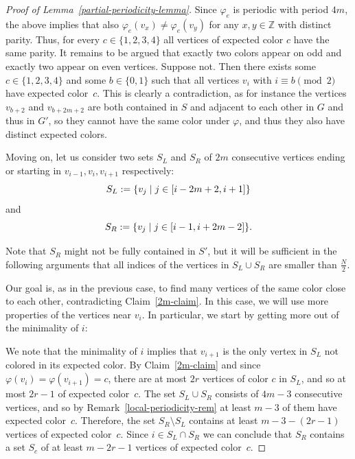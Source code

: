 \documentclass[a4paper,10pt,hidelinks]{amsart}
\renewcommand{\phi}{\ensuremath{\varphi}}
\theoremstyle{definition}
\begin{document}
\begin{proof}[Proof of Lemma~\ref{partial-periodicity-lemma}]
    Since $\phi_e$ is periodic with period $4m$, the above implies that also $\phi_e(v_x)\neq \phi_e(v_y)$ for any $x,y\in \mathbb{Z}$ with distinct parity. Thus, for every $c\in \{1,2,3,4\}$ all vertices of expected color $c$ have the same parity. It remains to be argued that exactly two colors appear on odd and exactly two appear on even vertices. Suppose not. Then there exists some $c\in \{1,2,3,4\}$ and some $b\in \{0,1\}$ such that all vertices $v_i$ with $i\equiv b\pmod{2}$ have expected color~$c$. This is clearly a contradiction, as for instance the vertices $v_{b+2}$ and $v_{b+2m+2}$ are both contained in $S$ and adjacent to each other in $G$ and thus in $G'$, so they cannot have the same color under $\phi$, and thus they also have distinct expected colors. 

    Moving on, let us consider two sets $S_L$ and $S_R$ of $2m$ consecutive vertices ending or starting in $v_{i-1}, v_i, v_{i+1}$ respectively:
    \begin{equation}\notag
        S_L := \{v_{j} \mid j \in [i - 2m + 2, i + 1]\}
    \end{equation}
    and
    \begin{equation}\notag
        S_R := \{v_{j} \mid j \in [i - 1, i + 2m - 2]\}.
    \end{equation}
    

    Note that $S_R$ might not be fully contained in $S'$, but it will be sufficient in the following arguments that all indices of the vertices in $S_L \cup S_R$ are smaller than $\frac{N}{2}$.

    Our goal is, as in the previous case, to find many vertices of the same color close to each other, contradicting Claim~\ref{2m-claim}. In this case, we will use more properties of the vertices near $v_i$. In particular, we start by getting more out of the minimality of $i$:

    We note that the minimality of $i$ implies that $v_{i + 1}$ is the only vertex in $S_L$ not colored in its expected color. By Claim~\ref{2m-claim} and since $\phi(v_i)=\phi(v_{i+1})=c$, there are at most $2r$ vertices of color $c$ in $S_L$, and so at most $2r - 1$ of expected color~$c$. The set $S_L \cup S_R$ consists of $4m-3$ consecutive vertices, and so by Remark~\ref{local-periodicity-rem} at least $m-3$ of them have expected color~$c$. Therefore, the set $S_R \setminus S_L$ contains at least $m - 3 - (2r - 1)$ vertices of expected color~$c$. Since $i \in S_L \cap S_R$ we can conclude that $S_R$ contains a set $S_c$ of at least $m - 2r - 1$ vertices of expected color~$c$. 
    

\end{proof}
\end{document}
